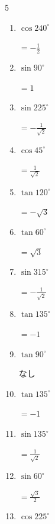 \begin{multicols}{5}
\begin{enumerate}
        $\displaystyle =-\frac{1}{\sqrt{2}}$

  \item $\displaystyle \cos{240^\circ}$

        $\displaystyle =-\frac{1}{2}$

  \item $\displaystyle \sin{90^\circ}$

        $\displaystyle =1$

  \item $\displaystyle \sin{225^\circ}$

        $\displaystyle =-\frac{1}{\sqrt{2}}$

  \item $\displaystyle \cos{45^\circ}$

        $\displaystyle =\frac{1}{\sqrt{2}}$

\columnbreak %

  \item $\displaystyle \tan{120^\circ}$

        $\displaystyle =-\sqrt{3}$

  \item $\displaystyle \tan{60^\circ}$

        $\displaystyle =\sqrt{3}$

  \item $\displaystyle \sin{315^\circ}$

        $\displaystyle =-\frac{1}{\sqrt{2}}$

  \item $\displaystyle \tan{135^\circ}$

        $\displaystyle =-1$

  \item $\displaystyle \tan{90^\circ}$

        $\displaystyle なし$

  \item $\displaystyle \tan{135^\circ}$

        $\displaystyle =-1$

  \item $\displaystyle \sin{135^\circ}$

        $\displaystyle =\frac{1}{\sqrt{2}}$

  \item $\displaystyle \sin{60^\circ}$

        $\displaystyle =\frac{\sqrt{3}}{2}$

  \item $\displaystyle \cos{225^\circ}$


\end{enumerate}
\end{multicols}
